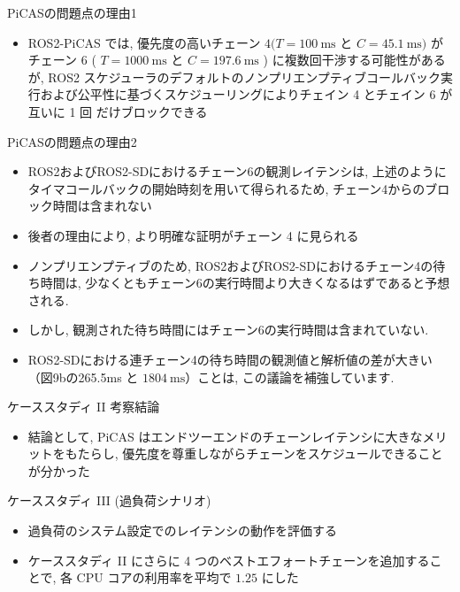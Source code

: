 \begin{frame}{PiCASの問題点の理由1}
    \begin{itemize}
        \item ROS2-PiCAS では, 優先度の高いチェーン $4(T=100 \mathrm{~ms}$ と $C=45.1 \mathrm{~ms})$ がチェーン 6 ( $T=1000 \mathrm{~ms}$ と $C=197.6 \mathrm{~ms}$ ) に複数回干渉する可能性があるが, ROS2 スケジューラのデフォルトのノンプリエンプティブコールバック実行および公平性に基づくスケジューリングによりチェイン 4 とチェイン 6 が互いに 1 回 だけブロックできる
    \end{itemize}
\end{frame}

\begin{frame}{PiCASの問題点の理由2}
    \begin{itemize}
        \item ROS2およびROS2-SDにおけるチェーン6の観測レイテンシは, 上述のようにタイマコールバックの開始時刻を用いて得られるため, チェーン4からのブロック時間は含まれない
        \item 後者の理由により, より明確な証明がチェーン 4 に見られる
        \item ノンプリエンプティブのため, ROS2およびROS2-SDにおけるチェーン4の待ち時間は, 少なくともチェーン6の実行時間より大きくなるはずであると予想される.
        \item しかし, 観測された待ち時間にはチェーン6の実行時間は含まれていない.
        \item ROS2-SDにおける連チェーン4の待ち時間の観測値と解析値の差が大きい（図9bの265.5ms と $1804 \mathrm{~ms}$）ことは, この議論を補強しています.
    \end{itemize}
\end{frame}

\begin{frame}{ケーススタディ II 考察結論}
    \begin{itemize}
        \item 結論として, PiCAS はエンドツーエンドのチェーンレイテンシに大きなメリットをもたらし, 優先度を尊重しながらチェーンをスケジュールできることが分かった
    \end{itemize}
\end{frame}


\begin{frame}{ケーススタディ III (過負荷シナリオ)}
    \begin{itemize}
        \item 過負荷のシステム設定でのレイテンシの動作を評価する
        \item ケーススタディ II にさらに 4 つのベストエフォートチェーンを追加することで, 各 CPU コアの利用率を平均で $1.25$ にした
    \end{itemize}
\end{frame}

